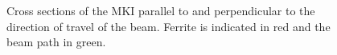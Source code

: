 \begin{figure}
\begin{center}

\end{center}
\caption{Cross sections of the MKI parallel to  and perpendicular to  the direction of travel of the beam. Ferrite is indicated in red and the beam path in green.}
\label{fig:mkiCrossSections}
\end{figure}

